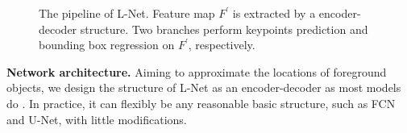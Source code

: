\documentclass{article}
\begin{document}


\begin{figure}[t]\vspace{-5pt}
    \centering

    \vspace{-10pt}
        \caption{The pipeline of L-Net. Feature map $F^{\prime}$ is extracted by a encoder-decoder structure. Two branches perform keypoints prediction and bounding box regression on $F^{\prime}$, respectively.}
    \label{fig:L-Net}\vspace{-15pt}
\end{figure}

\textbf{Network architecture.}
Aiming to approximate the locations of foreground objects, we design the structure of L-Net as an encoder-decoder as most models do \cite{unet, deeplab, hourglass}. In practice, it can flexibly be any reasonable basic structure, such as FCN\cite{FCN} and U-Net\cite{unet}, with little modifications. \par
\end{document}
